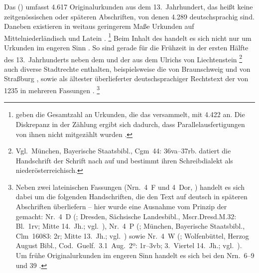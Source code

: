 Das  (\CAO) umfasst 4.617
Originalurkunden aus dem 13.\ Jahrhundert, das heißt keine zeitgenössischen
oder späteren Abschriften, von denen 4.289 deutschsprachig sind. Daneben
existieren in weitaus geringerem Maße Urkunden auf Mittelniederländisch und
Latein \autocites[\RN{1}]{deboor1976}[25]{schulze2011}[40--41]{ganslmayer2012}.%
%
	\footnote{\citet[391]{gniffkerapp2005} geben die Gesamtzahl an Urkunden,
	die das \CAO{} versammelt, mit 4.422 an. Die Diskrepanz in der
	Zählung ergibt sich dadurch, dass Parallelausfertigungen von ihnen nicht
	mitgezählt wurden
	\autocite[vgl.][40]{ganslmayer2012}.\label{fn:caowordcount}}
%
Beim Inhalt des \CAO{} handelt es sich nicht nur um Urkunden im engeren Sinn
\autocite[596]{schmidtwiegand1998b}. So sind gerade für die Frühzeit in der
ersten Hälfte des 13.~Jahrhunderts neben dem 
\autocites(Nr.~1, Erfurt, um 1200)[1,2--10]{cao1} und der  aus
dem  Ulrichs von Liechtenstein
\autocites(Nr.~3, Schloss Liechtenstein, Bz.~Murtal, 1227)[5,13--40]{cao1}%
%
	\footnote{Vgl.\ München, Bayerische Staatsbibl., Cgm~44: 36va--37rb.
	\citet[230--231]{schneider1987} datiert die Handschrift der Schrift
	nach auf  und bestimmt ihren Schreibdialekt als
	niederösterreichisch.}
%
auch diverse Stadtrechte enthalten, beispielsweise die von Braunschweig
\autocites(Nr.~2, 1227)[1,12--5,11]{cao1} und von Straßburg
\autocites(Nr.~N~238~A und B, 1283 bzw.\ Ende 13.~Jh.)[179,21--194.15;
179,29--194,32]{cao5}, sowie als ältester überlieferter deutschsprachiger
Rechtstext der  von 1235 in mehreren Fassungen
\autocites(Nr.~4)[14,11--17,55]{cao1}.%
%
	\footnote{Neben zwei lateinischen Fassungen (Nrn.~4~F und
	4~Dor, \cite[5,42--9,17; 9,19--12,15]{cao1}) handelt es sich dabei um die
	folgenden Handschriften, die den Text auf deutsch in späteren Abschriften
	überliefern -- hier wurde eine Ausnahme vom Prinzip der 
	gemacht:
	Nr.~4~D
		(\cite[14,11--15,53]{cao1};
		Dresden, Sächsische Landesbibl., Mscr.Dresd.M.32: Bl.~1rv;
		Mitte 14.\ Jh.; vgl.~\cite[7549]{hsc}),
	Nr.~4~P
		(\cite[12,17--14,09]{cao1};
		München, Bayerische Staatsbibl., Clm~16083: 2r;
		Mitte 13.\ Jh.; vgl.~\cites[256]{haas2010}[19293]{hsc}) sowie
	Nr.~4~W
		(\cite[14,11--17,55]{cao1};
		Wolfenbüttel, Herzog August Bibl., Cod.~Guelf.~3.1~Aug.~2º: 1r--3vb;
		3.~Viertel 14.~Jh.; vgl.~\cite[8396]{hsc}).
	Um frühe Originalurkunden im engeren Sinn handelt es sich bei den Nrn.~6--9
	und 39 \autocites[20,44--23,24;
	69,2--21]{cao1}[vgl.][15--16]{bertelsmeierkierst2008}.%
	}
